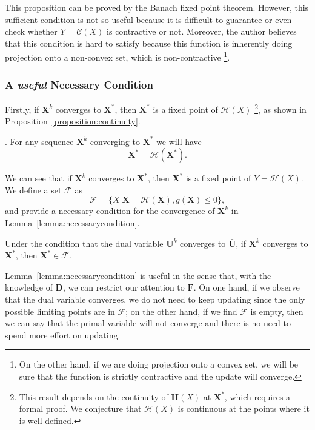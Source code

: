 This proposition can be proved by the Banach fixed point theorem. However, this sufficient condition is not so useful because it is difficult to guarantee or even check whether $Y = \mathcal{C}(X)$ is contractive or not. Moreover, the author believes that this condition is hard to satisfy because this function is inherently doing projection onto a non-convex set, which is non-contractive \footnote{On the other hand, if we are doing projection onto a convex set, we will be sure that the function is strictly contractive and the update will converge.}.

\subsubsection{A \textit{useful} Necessary Condition}
\fi
Firstly, if $\mathbf{X}^k$ converges to $\mathbf{X}^*$, then $\mathbf{X}^*$ is a fixed point of $\mathcal{H}(X)$ \footnote{This result depends on the continuity of $\mathbf{H}(X)$ at $\mathbf{X}^*$, which requires a formal proof. We conjecture that $\mathcal{H}(X)$ is continuous at the points where it is well-defined.}, as shown in Proposition~\ref{proposition:continuity}.

\begin{proposition}\label{proposition:continuity}.
For any sequence $\mathbf{X}^k$ converging to $\mathbf{X}^*$ we will have
$$\mathbf{X}^* = \mathcal{H}(\mathbf{X}^*).$$
\end{proposition}



We can see that if $\mathbf{X}^k$ converges to $\mathbf{X}^*$, then $\mathbf{X}^*$ is a fixed point of $Y = \mathcal{H}(X)$. We define a set $\mathcal{F}$ as $$\mathcal{F} = \{X|\mathbf{X} = \mathcal{H}(\mathbf{X}), g(\mathbf{X})\leq 0\},$$
and provide a necessary condition for the convergence of $\mathbf{X}^k$ in Lemma~\ref{lemma:necessarycondition}.

\begin{lemma}\label{lemma:necessarycondition}
Under the condition that the dual variable $\mathbf{U}^k$ converges to $\bar{\mathbf{U}}$, if $\mathbf{X}^k$ converges to $\mathbf{X}^*$, then $\mathbf{X}^*\in\mathcal{F}$.
\end{lemma}


Lemma~\ref{lemma:necessarycondition} is useful in the sense that, with the knowledge of $\mathbf{D}$, we can restrict our attention to $\mathbf{F}$. On one hand, if we observe that the dual variable converges, we do not need to keep updating since the only possible limiting points are in $\mathcal{F}$; on the other hand, if we find $\mathcal{F}$ is empty, then we can say that the primal variable will not converge and there is no need to spend more effort on updating.


